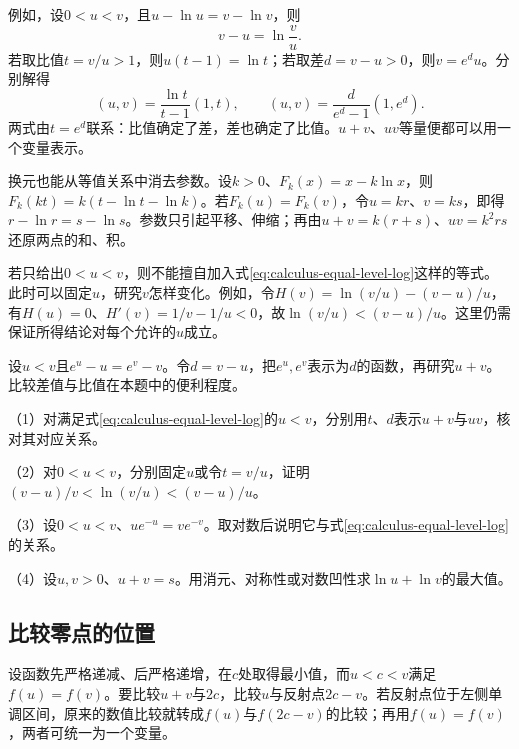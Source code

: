 例如，设\(0<u<v\)，且\(u-\ln u=v-\ln v\)，则
\begin{equation}\label{eq:calculus-equal-level-log}
 v-u=\ln\frac vu.
\end{equation}
若取比值\(t=v/u>1\)，则\(u(t-1)=\ln t\)；若取差\(d=v-u>0\)，则\(v=e^du\)。分别解得
\begin{equation*}
 (u,v)=\frac{\ln t}{t-1}(1,t),
 \qquad
 (u,v)=\frac{d}{e^d-1}(1,e^d).
\end{equation*}
两式由\(t=e^d\)联系：比值确定了差，差也确定了比值。\(u+v\)、\(uv\)等量便都可以用一个变量表示。

换元也能从等值关系中消去参数。设\(k>0\)、\(F_k(x)=x-k\ln x\)，则\(F_k(kt)=k(t-\ln t-\ln k)\)。若\(F_k(u)=F_k(v)\)，令\(u=kr\)、\(v=ks\)，即得\(r-\ln r=s-\ln s\)。参数只引起平移、伸缩；再由\(u+v=k(r+s)\)、\(uv=k^2rs\)还原两点的和、积。

若只给出\(0<u<v\)，则不能擅自加入式\eqref{eq:calculus-equal-level-log}这样的等式。此时可以固定\(u\)，研究\(v\)怎样变化。例如，令\(H(v)=\ln(v/u)-(v-u)/u\)，有\(H(u)=0\)、\(H'(v)=1/v-1/u<0\)，故\(\ln(v/u)<(v-u)/u\)。这里仍需保证所得结论对每个允许的\(u\)成立。

\begin{example}
设\(u<v\)且\(e^u-u=e^v-v\)。令\(d=v-u\)，把\(e^u,e^v\)表示为\(d\)的函数，再研究\(u+v\)。比较差值与比值在本题中的便利程度。
\end{example}

\begin{exercise}
\mbox{}\par\nobreak

（1）对满足式\eqref{eq:calculus-equal-level-log}的\(u<v\)，分别用\(t\)、\(d\)表示\(u+v\)与\(uv\)，核对其对应关系。

（2）对\(0<u<v\)，分别固定\(u\)或令\(t=v/u\)，证明\((v-u)/v<\ln(v/u)<(v-u)/u\)。

（3）设\(0<u<v\)、\(ue^{-u}=ve^{-v}\)。取对数后说明它与式\eqref{eq:calculus-equal-level-log}的关系。

（4）设\(u,v>0\)、\(u+v=s\)。用消元、对称性或对数凹性求\(\ln u+\ln v\)的最大值。
\end{exercise}

\subsection{比较零点的位置}

设函数先严格递减、后严格递增，在\(c\)处取得最小值，而\(u<c<v\)满足\(f(u)=f(v)\)。要比较\(u+v\)与\(2c\)，比较\(u\)与反射点\(2c-v\)。若反射点位于左侧单调区间，原来的数值比较就转成\(f(u)\)与\(f(2c-v)\)的比较；再用\(f(u)=f(v)\)，两者可统一为一个变量。

